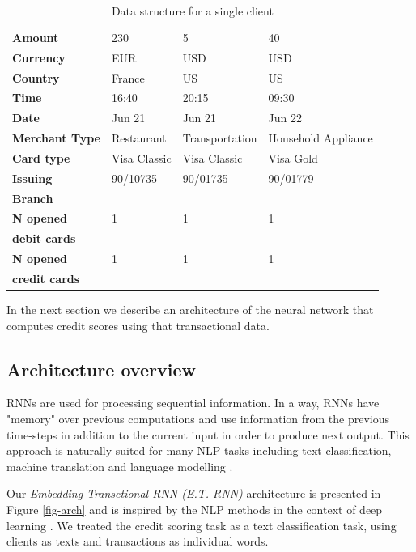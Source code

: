 \documentclass[sigconf]{acmart}
\begin{document}
\begin{table}[ht]
\caption{Data structure for a single client}
\begin{tabular}{ | m{7em} |  m{5em} m{5em} m{5em}| }
\hline
\textbf{Amount} & 230 & 5 & 40 \\
\textbf{Currency} & EUR & USD & USD \\
\textbf{Country} & France & US & US \\
\textbf{Time} & 16:40 & 20:15 & 09:30 \\
\textbf{Date} & Jun 21 & Jun 21 & Jun 22 \\
\textbf{Merchant Type} & Restaurant & Transport\-ation & Household Appliance \\
\textbf{Card type} & Visa Classic & Visa Classic & Visa Gold \\
\textbf{Issuing} & 90/10735 & 90/01735 & 90/01779 \\
\textbf{Branch} &&& \\
\textbf{N opened} & 1 & 1& 1 \\
\textbf{debit cards} &&& \\
\textbf{N opened} & 1 & 1& 1 \\
\textbf{credit cards} &&& \\
\hline
\end{tabular}
\label{tab-tr-data}
\end{table}

In the next section we describe an architecture of the neural network that computes credit scores using that transactional data.

\subsection{Architecture overview}

RNNs are used for processing sequential information.  In a way, RNNs have "memory" over previous computations and use information from the previous time-steps in addition to the current input in order to produce next output. This approach is naturally suited for many NLP tasks including text classification, machine translation and language modelling \cite{mikolov2010recurrent}.

Our \textit{Embedding-Transctional RNN (E.T.-RNN)} architecture is presented in Figure \ref{fig-arch} and is inspired by the NLP methods in the context of deep learning \cite{mikolov2010recurrent}. We treated the credit scoring task as a text classification task, using clients as texts and transactions as individual words.
\end{document}
